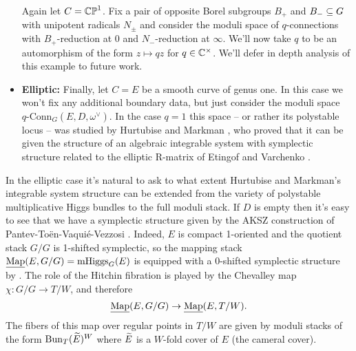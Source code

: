 \documentclass[10pt, oneside]{article}
\DeclareMathOperator{\mhiggs}{mHiggs}
\newcommand{\map}{\ul{\mr{Map}}}
\newcommand{\qconn}{q\text{-Conn}}
\begin{document}
\begin{examples}
\begin{itemize}
  Again let $C = \mathbb{CP}^1$.  Fix a pair of opposite Borel subgroups $B_+$ and $B_- \subseteq G$ with unipotent radicals $N_\pm$ and consider the moduli space of $q$-connections with $B_+$-reduction at $0$ and $N_-$-reduction at $\infty$.  We'll now take $q$ to be an automorphism of the form $z \mapsto qz$ for $q \in \mathbb{C}^\times$.  We'll defer in depth analysis of this example to future work.
  \item \textbf{Elliptic:} Finally, let $C = E$ be a smooth curve of genus one.  In this case we won't fix any additional boundary data, but just consider the moduli space $\qconn_G(E,D, \omega^\vee)$.  In the case $q = 1$ this space -- or rather its polystable locus -- was studied by Hurtubise and Markman \cite{HurtubiseMarkman}, who proved that it can be given the structure of an algebraic integrable system with symplectic structure related to the elliptic R-matrix of Etingof and Varchenko \cite{EtingofVarchenko}.
 \end{itemize}
\end{examples}

 

\begin{remark}
In the elliptic case it's natural to ask to what extent Hurtubise and Markman's integrable system structure can be extended from the variety of polystable multiplicative Higgs bundles to the full moduli stack.  If $D$ is empty then it's easy to see that we have a symplectic structure given by the AKSZ construction of Pantev-To\"en-Vaqui\'e-Vezzosi \cite{PTVV}.  Indeed, $E$ is compact 1-oriented and the quotient stack $G/G$ is 1-shifted symplectic, so the mapping stack $\map(E, G/G) = \mhiggs_G(E)$ is equipped with a 0-shifted symplectic structure by \cite[Theorem 2.5]{PTVV}.  The role of the Hitchin fibration is played by the Chevalley map $\chi \colon G/G \to T/W$, and therefore
\[\map(E,G/G) \to \map(E,T/W).\]
The fibers of this map over regular points in $T/W$ are given by moduli stacks of the form $\operatorname{Bun}_T(\widetilde{E})^W$ where $\widetilde{E}$ is a $W$-fold cover of $E$ (the cameral cover). 
\end{remark}
\end{document}
